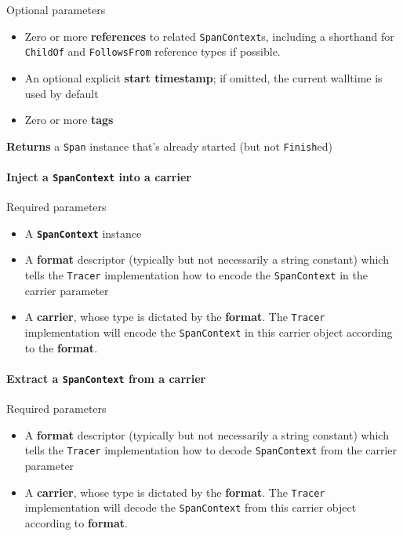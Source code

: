 \documentclass[a4paper,12pt,notitlepage,twoside,openright]{article}
\begin{document}
Optional parameters

\begin{itemize}

\item
  Zero or more \textbf{references} to related \texttt{SpanContext}s,
  including a shorthand for \texttt{ChildOf} and \texttt{FollowsFrom}
  reference types if possible.
\item
  An optional explicit \textbf{start timestamp}; if omitted, the current
  walltime is used by default
\item
  Zero or more \textbf{tags}
\end{itemize}

\textbf{Returns} a \texttt{Span} instance that's already started (but
not \texttt{Finish}ed)

\hypertarget{inject-a-spancontext-into-a-carrier}{%
\paragraph{\texorpdfstring{Inject a \texttt{SpanContext} into a
carrier}{Inject a SpanContext into a carrier}}\label{inject-a-spancontext-into-a-carrier}}

Required parameters

\begin{itemize}

\item
  A \textbf{\texttt{SpanContext}} instance
\item
  A \textbf{format} descriptor (typically but not necessarily a string
  constant) which tells the \texttt{Tracer} implementation how to encode
  the \texttt{SpanContext} in the carrier parameter
\item
  A \textbf{carrier}, whose type is dictated by the \textbf{format}. The
  \texttt{Tracer} implementation will encode the \texttt{SpanContext} in
  this carrier object according to the \textbf{format}.
\end{itemize}

\hypertarget{extract-a-spancontext-from-a-carrier}{%
\paragraph{\texorpdfstring{Extract a \texttt{SpanContext} from a
carrier}{Extract a SpanContext from a carrier}}\label{extract-a-spancontext-from-a-carrier}}

Required parameters

\begin{itemize}

\item
  A \textbf{format} descriptor (typically but not necessarily a string
  constant) which tells the \texttt{Tracer} implementation how to decode
  \texttt{SpanContext} from the carrier parameter
\item
  A \textbf{carrier}, whose type is dictated by the \textbf{format}. The
  \texttt{Tracer} implementation will decode the \texttt{SpanContext}
  from this carrier object according to \textbf{format}.
\end{itemize}
\end{document}
